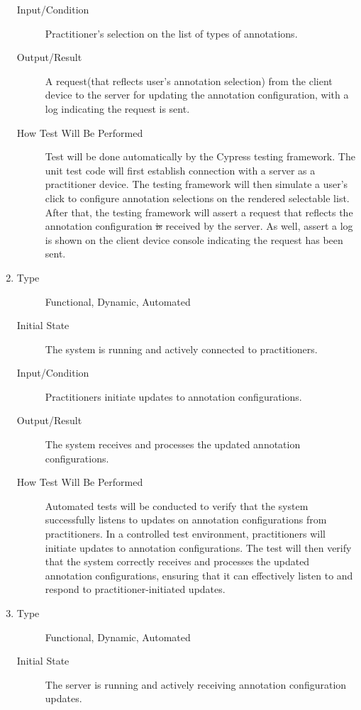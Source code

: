 \documentclass[12pt, titlepage]{article}
\begin{document}
\begin{enumerate}[FR-T1]
\begin{description}
  \item[Input/Condition] Practitioner’s selection on the list of types of
    annotations.
  \item[Output/Result] A request(that reflects user’s annotation selection) from
    the client device to the server for updating the annotation configuration,
    with a log indicating the request is sent.
  \item[How Test Will Be Performed] Test will be done automatically by the
    Cypress testing framework. The unit test code will first establish connection
    with a server as a practitioner device. The testing framework will then
    simulate a user's click to configure annotation selections on the rendered
    selectable list. After that, the testing framework will assert a request
    that reflects the annotation configuration \sout{is} received by the server. As
    well, assert a log is shown on the client device console indicating the
    request has been sent.
  \end{description}
\item \label{FRT6}
  \begin{description}
  \item[Type] Functional, Dynamic, Automated
  \item[Initial State] The system is running and actively connected to
    practitioners.
  \item[Input/Condition] Practitioners initiate updates to annotation
    configurations.
  \item[Output/Result] The system receives and processes the updated annotation
    configurations.
  \item[How Test Will Be Performed] Automated tests will be conducted to verify
    that the system successfully listens to updates on annotation configurations
    from practitioners. In a controlled test environment, practitioners will
    initiate updates to annotation configurations. The test will then verify
    that the system correctly receives and processes the updated annotation
    configurations, ensuring that it can effectively listen to and respond to
    practitioner-initiated updates.
  \end{description}
\item \label{FRT7}
  \begin{description}
  \item[Type] Functional, Dynamic, Automated
  \item[Initial State] The server is running and actively receiving annotation
    configuration updates.

\end{description}
\end{enumerate}
\end{document}
